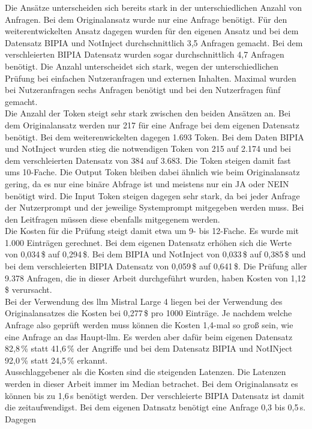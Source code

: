 Die Ansätze unterscheiden sich bereits stark in der unterschiedlichen Anzahl von Anfragen. Bei dem Originalansatz wurde nur eine Anfrage benötigt. Für den 
weiterentwickelten Ansatz dagegen wurden für den eigenen Ansatz und bei dem Datensatz BIPIA und NotInject durchschnittlich 3,5 Anfragen gemacht. Bei dem 
verschleierten BIPIA Datensatz wurden sogar durchschnittlich 4,7 Anfragen benötigt. Die Anzahl unterscheidet sich stark, wegen der unterschiedlichen
Prüfung bei einfachen Nutzeranfragen und externen Inhalten. Maximal wurden bei Nutzeranfragen sechs Anfragen benötigt und bei den Nutzerfragen fünf gemacht. \\
Die Anzahl der Token steigt sehr stark zwischen den beiden Ansätzen an. Bei dem Originalansatz werden nur 217 für eine Anfrage bei dem eigenen Datensatz
benötigt. Bei dem weiterenwickelten dagegen 1.693 Token. Bei dem Daten BIPIA und NotInject wurden stieg die notwendigen Token von 215 auf 2.174 und bei dem 
verschleierten Datensatz von 384 auf 3.683. Die Token steigen damit fast ums 10-Fache. Die Output Token bleiben dabei ähnlich wie beim Originalansatz gering, da
es nur eine binäre Abfrage ist und meistens nur ein JA oder NEIN benötigt wird. Die Input Token steigen dagegen sehr stark, da bei jeder Anfrage der Nutzerprompt und
der jeweilige Systemprompt mitgegeben werden muss. Bei den Leitfragen müssen diese ebenfalls mitgegenem werden. \\
Die Kosten für die Prüfung steigt damit etwa um 9- bis 12-Fache. Es wurde mit 1.000 Einträgen gerechnet. Bei dem eigenen Datensatz erhöhen sich die Werte von
0,034\,\$ auf 0,294\,\$. Bei dem BIPIA und NotInject von 0,033\,\$ auf 0,385\,\$ und bei dem verschleierten BIPIA Datensatz von 0,059\,\$ auf 0,641\,\$. 
Die Prüfung aller 9.378 Anfragen, die in dieser Arbeit durchgeführt wurden, haben Kosten von 1,12\,\$ verursacht. \\
Bei der Verwendung des \ac{llm} Mistral Large 4 liegen bei der Verwendung des Originalansatzes die Kosten bei 0,277\,\$ pro 1000 Einträge. Je nachdem welche 
Anfrage also geprüft werden muss können die Kosten 1,4-mal so groß sein, wie eine Anfrage an das Haupt-\ac{llm}. Es werden aber dafür beim eigenen Datensatz 
82,8\,\% statt 41,6\,\%  der Angriffe und bei dem Datensatz BIPIA und NotINject 92,0\,\% statt 24,5\,\% erkannt. \\
Ausschlaggebener als die Kosten sind die steigenden Latenzen. Die Latenzen werden in dieser Arbeit immer im Median betrachet. Bei dem Originalansatz es können bis 
zu 1,6\,s benötigt werden. Der verschleierte BIPIA Datensatz ist damit die zeitaufwendigst. Bei dem eigenen Datnsatz benötigt eine Anfrage 0,3 bis 0,5\,s. Dagegen
